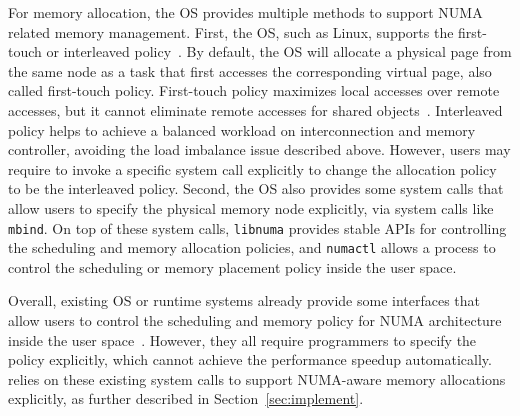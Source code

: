 For memory allocation, the OS provides multiple methods to support NUMA related memory management. First, the OS, such as Linux, supports the first-touch or interleaved policy~\cite{lameter2013numa, diener2015locality}. By default, the OS will allocate a physical page from the same node as a task that first accesses the corresponding virtual page, also called  first-touch policy. First-touch policy maximizes local accesses over remote accesses, but it cannot eliminate remote accesses for shared objects~\cite{yang2019jarena}. Interleaved policy helps to achieve a balanced workload  on interconnection and memory controller, avoiding the load imbalance issue described above. However, users may require to invoke a specific system call explicitly to change the allocation policy to be the interleaved policy.  Second, the OS also provides some system calls that allow users to specify the physical memory node explicitly, via system calls like \texttt{mbind}. On top of these system calls, \texttt{libnuma} provides stable APIs for controlling the scheduling and memory allocation policies, and \texttt{numactl} allows a process to control the scheduling or memory placement policy inside the user space. 

Overall, existing OS or runtime systems already provide some interfaces that allow users to control the scheduling and memory policy for NUMA architecture inside the user space~\cite{yang2019jarena}. However, they all require programmers to specify the policy explicitly, which cannot achieve the performance speedup automatically. \NM{} relies on these existing system calls to support NUMA-aware memory allocations explicitly, as further described in Section~\ref{sec:implement}. 







 
